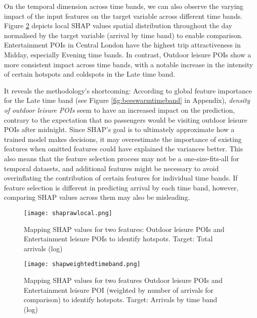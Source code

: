 On the temporal dimension across time bands, we can also observe the varying impact of the input features on the target variable across different time bands. Figure \ref{fig:shapweightedtimeband} depicts local SHAP values spatial distribution throughout the day normalised by the target variable (arrival by time band) to enable comparison. Entertainment POIs in Central London have the highest trip attractiveness in Midday, especially Evening time bands. In contrast, Outdoor leisure POIs show a more consistent impact across time bands, with a notable increase in the intensity of certain hotspots and coldspots in the Late time band. 

It reveals the methodology's shortcoming: According to global feature importance for the Late time band (see Figure \ref{fig:beeswarmtimeband} in Appendix), \textit{density of outdoor leisure POIs} seem to have an increased impact on the prediction, contrary to the expectation that no passengers would be visiting outdoor leisure POIs after midnight. Since SHAP's goal is to ultimately approximate how a trained model makes decisions, it may overestimate the importance of existing features when omitted features could have explained the variances better. This also means that the feature selection process may not be a one-size-fits-all for temporal datasets, and additional features might be necessary to avoid overinflating the contribution of certain features for individual time bands. If feature selection is different in predicting arrival by each time band, however, comparing SHAP values across them may also be misleading.

\begin{figure}[ht]
    \centering
    \texttt{[image: shaprawlocal.png]}
    \captionsetup{justification=centering}
    \caption{Mapping SHAP values for two features: Outdoor leisure POIs and Entertainment leisure POIs to identify hotspots. Target: Total arrivals (log)}
    \label{fig:shapraw}
\end{figure}

\begin{figure}[ht]
    \centering
    \texttt{[image: shapweightedtimeband.png]}
    \captionsetup{justification=centering}
    \caption{Mapping SHAP values for two features Outdoor leisure POIs and Entertainment leisure POI (weighted by number of arrivals for comparison) to identify hotspots. Target: Arrivals by time band (log)}
    \label{fig:shapweightedtimeband}
\end{figure}

